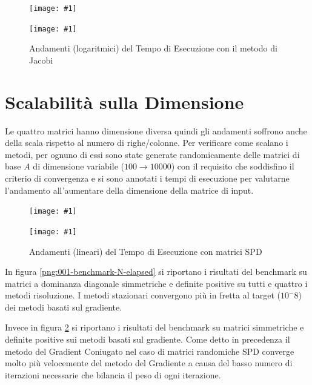 \documentclass[a4paper,11pt,oneside, table]{article}
\newcommand{\putsubimage}[5] {
  \begin{minipage}{{#4}\linewidth}
	    \centering
      \texttt{[image: \#1]}
	    \caption{#2}\label{#3}
	\end{minipage}
}
\newcommand{\putimagecouple}[2] {
  \begin{figure}[!htb]
      \centering
      #1
      \hspace{0.5cm}
      #2
  \end{figure}
}
\begin{document}
\putimagecouple
  {\putsubimage{./images/te-re-gse.png}{Andamenti (logaritmici) del Tempo di Esecuzione con il metodo di Gauss Seidel}{png:te-re-gse}{0.4}{0.99}}
  {\putsubimage{./images/te-re-jae.png}{Andamenti (logaritmici) del Tempo di Esecuzione con il metodo di Jacobi}{png:te-re-jae}{0.4}{0.99}}

\section{Scalabilit\`a sulla Dimensione}

Le quattro matrici hanno dimensione diversa quindi gli andamenti soffrono anche della scala rispetto al numero di righe/colonne. Per verificare come scalano i metodi, per ognuno di essi sono state generate randomicamente delle matrici di base $A$ di dimensione variabile ($100 \rightarrow 10000$) con il requisito che soddisfino il criterio di convergenza e si sono annotati i tempi di esecuzione per valutarne l'andamento all'aumentare della dimensione della matrice di input.

\putimagecouple
  {\putsubimage{./images/001-benchmark-N-elapsed.png}{Andamenti (lineari) del Tempo di Esecuzione con matrici RDD}{png:001-benchmark-N-elapsed}{0.4}{0.99}}
  {\putsubimage{./images/002-benchmark-N-elapsed.png}{Andamenti (lineari) del Tempo di Esecuzione con matrici SPD}{png:002-benchmark-N-elapsed}{0.4}{0.99}}

In figura \ref{png:001-benchmark-N-elapsed} si riportano i risultati del benchmark su matrici a dominanza diagonale simmetriche e definite positive su tutti e quattro i metodi risoluzione.
I metodi stazionari convergono pi\`u in fretta al target ($10^-8$) dei metodi basati sul gradiente.

Invece in figura \ref{png:002-benchmark-N-elapsed} si riportano i risultati del benchmark su matrici simmetriche e definite positive sui metodi basati sul gradiente.
Come detto in precedenza il metodo del Gradient Coniugato nel caso di matrici randomiche SPD converge molto pi\`u velocemente del metodo del Gradiente a causa del basso numero di iterazioni necessarie che bilancia il peso di ogni iterazione.

\printbibliography[title={Bibliografia}]
\end{document}

